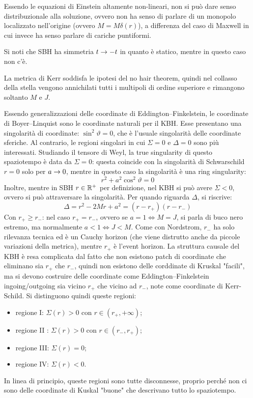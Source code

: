 Essendo le equazioni di Einstein altamente non-lineari, non si può dare senso distribuzionale alla soluzione, ovvero non ha senso di parlare di un monopolo localizzato nell'origine (ovvero $ M = M \delta(r) $), a differenza del caso di Maxwell in cui invece ha senso parlare di cariche puntiformi.

Si noti che SBH ha simmetria $ t \rightarrow -t $ in quanto è statico, mentre in questo caso non c'è.

La metrica di Kerr soddisfa le ipotesi del no hair theorem, quindi nel collasso della stella vengono annichilati tutti i multipoli di ordine superiore e rimangono soltanto $ M $ e $ J $.

Essendo generalizzazioni delle coordinate di Eddington--Finkelstein, le coordinate di Boyer--Linquist sono le coordinate naturali per il KBH. Esse presentano una singolarità di coordinate: $ \sin^2 \vartheta = 0 $, che è l'usuale singolarità delle coordinate sferiche. Al contrario, le regioni singolari in cui $ \Sigma = 0 $ e $ \Delta = 0 $ sono più interessati. Studiando il tensore di Weyl, la true singularity di questo spaziotempo è data da $ \Sigma = 0 $: questa coincide con la singolarità di Schwarschild $ r = 0 $ solo per $ a \rightarrow 0 $, mentre in questo caso la singolarità è una ring singularity:
\begin{equation}
  r^2 + a^2 \cos^2 \vartheta = 0
\end{equation}
Inoltre, mentre in SBH $ r \in \mathbb{R}^+ $ per definizione, nel KBH si può avere $ \Sigma < 0 $, ovvero si può attraversare la singolarità. Per quando riguarda $ \Delta $, si riscrive:
\begin{equation*}
  \Delta = r^2 - 2 M r + a^2 = (r - r_+) (r - r_-)
\end{equation*}
Con $ r_+ \geq r_- $: nel caso $ r_+ = r_- $, ovvero se $ a = 1 \iff M = J $, si parla di buco nero estremo, ma normalmente $ a < 1 \iff J < M $. Come con Nordstrom, $ r_- $ ha solo rilevanza tecnica ed è un Cauchy horizon (che viene distrutto anche da piccole variazioni della metrica), mentre $ r_+ $ è l'event horizon. La struttura causale del KBH è resa complicata dal fatto che non esistono patch di coordinate che eliminano sia $ r_+ $ che $ r_- $, quindi non esistono delle corddinate di Kruskal "facili", ma si devono costruire delle coordinate come Eddington--Finkelstein ingoing/outgoing sia vicino $ r_+ $ che vicino ad $ r_- $, note come coordinate di Kerr-Schild. Si distinguono quindi queste regioni:
\begin{itemize}
  \item regione I: $ \Sigma(r) > 0 $ con $ r \in (r_+ , +\infty) $;
  \item regione II : $ \Sigma(r) > 0 $ con $ r \in (r_- , r_+) $;
  \item regione III: $ \Sigma(r) = 0 $;
  \item regione IV: $ \Sigma(r) < 0 $.
\end{itemize}
In linea di principio, queste regioni sono tutte disconnesse, proprio perché non ci sono delle coordinate di Kuskal "buone" che descrivano tutto lo spaziotempo.

